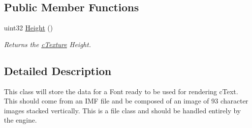 \subsection*{Public Member Functions}
\begin{DoxyCompactItemize}
\item 
\hypertarget{classc_font_a3fa379c0126af4edd8c4f7bb39507a13}{
uint32 \hyperlink{classc_font_a3fa379c0126af4edd8c4f7bb39507a13}{Height} ()}
\label{classc_font_a3fa379c0126af4edd8c4f7bb39507a13}

\begin{DoxyCompactList}\small\item\em Returns the \hyperlink{classc_texture}{cTexture} Height. \end{DoxyCompactList}\end{DoxyCompactItemize}


\subsection{Detailed Description}
This class will store the data for a Font ready to be used for rendering cText. This should come from an IMF file and be composed of an image of 93 character images stacked vertically. This is a file class and should be handled entirely by the engine. 